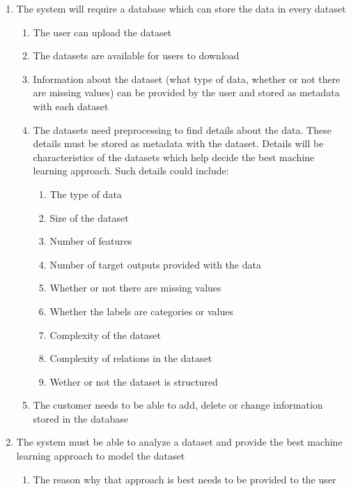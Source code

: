 \documentclass[titlepage]{article}
\begin{document}
\begin{enumerate}
  \item The system will require a database which can store the data in every dataset
  
  \begin{enumerate}
    \item The user can upload the dataset
  
    \item The datasets are available for users to download
    
    \item Information about the dataset (what type of data, whether or not there are missing values) can be provided by the user and stored as metadata with each dataset
    
    \item The datasets need preprocessing to find details about the data. These details must be stored as metadata with the dataset. Details will be characteristics of the datasets which help decide the best machine learning approach. Such details could include:
    \begin{enumerate}
      \item The type of data
      \item Size of the dataset
      \item Number of features
      \item Number of target outputs provided with the data
      \item Whether or not there are missing values
      \item Whether the labels are categories or values
      \item Complexity of the dataset
      \item Complexity of relations in the dataset
      \item Wether or not the dataset is structured
    \end{enumerate}

    \item The customer needs to be able to add, delete or change information stored in the database
  \end{enumerate}
  
  \item The system must be able to analyze a dataset and provide the best machine learning approach to model the dataset
  \begin{enumerate}
    \item The reason why that approach is best needs to be provided to the user
  

\end{enumerate}
\end{enumerate}
\end{document}
